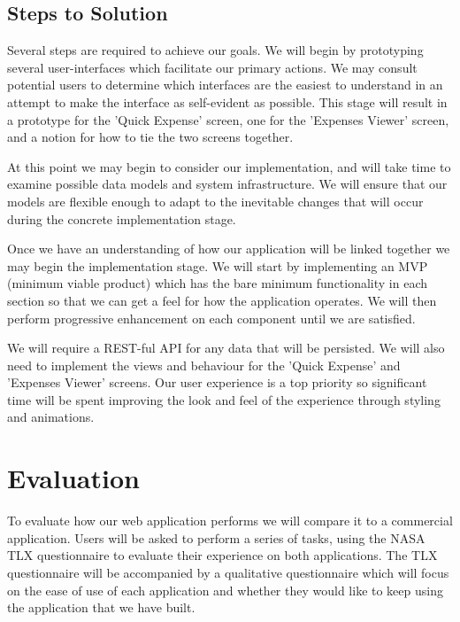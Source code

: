 \documentclass{chi2011}
\begin{document}
\subsection{Steps to Solution}

Several steps are required to achieve our goals. We will begin by prototyping several user-interfaces which facilitate
our primary actions. We may consult potential users to determine which interfaces are the easiest to understand in an
attempt to make the interface as self-evident as possible. This stage will result in a prototype for the 'Quick
Expense' screen, one for the 'Expenses Viewer' screen, and a notion for how to tie the two screens together.

At this point we may begin to consider our implementation, and will take time to examine possible data models and
system infrastructure. We will ensure that our models are flexible enough to adapt to the inevitable changes that will
occur during the concrete implementation stage.

Once we have an understanding of how our application will be linked together we may begin the implementation stage. We
will start by implementing an MVP (minimum viable product) which has the bare minimum functionality in each section so
that we can get a feel for how the application operates. We will then perform progressive enhancement on each component
until we are satisfied.

We will require a REST-ful API for any data that will be persisted. We will also need to implement the views and
behaviour for the 'Quick Expense' and 'Expenses Viewer' screens. Our user experience is a top priority so 
significant time will be spent improving the look and feel of the experience through styling and animations.

\section{Evaluation}

To evaluate how our web application performs we will compare it to a commercial application. Users
will be asked to perform a series of tasks, using the NASA TLX questionnaire to evaluate their experience
on both applications. The TLX questionnaire will be accompanied by a qualitative questionnaire 
which will focus on the ease of use of each application and whether they would like to keep using the
application that we have built.
\printbibliography
\end{document}
